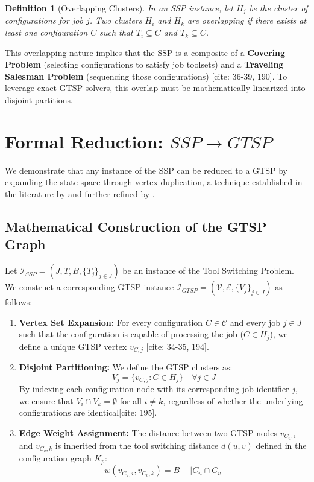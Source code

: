 \documentclass[12pt]{article}
\newtheorem{definition}{Definition}[section]
\begin{document}
\begin{definition}[Overlapping Clusters]
In an SSP instance, let $H_j$ be the cluster of configurations for job $j$. Two clusters $H_i$ and $H_k$ are overlapping if there exists at least one configuration $C$ such that $T_i \subseteq C$ and $T_k \subseteq C$. 
\end{definition}

This overlapping nature implies that the SSP is a composite of a \textbf{Covering Problem} (selecting configurations to satisfy job toolsets) and a \textbf{Traveling Salesman Problem} (sequencing those configurations) [cite: 36-39, 190]. To leverage exact GTSP solvers, this overlap must be mathematically linearized into disjoint partitions.

\section{Formal Reduction: $SSP \rightarrow GTSP$}

We demonstrate that any instance of the SSP can be reduced to a GTSP by expanding the state space through vertex duplication, a technique established in the literature by \textcite{Noon1993} and further refined by \textcite{Lien2015}.

\subsection{Mathematical Construction of the GTSP Graph}
Let $\mathcal{I}_{SSP} = (J, T, B, \{T_j\}_{j \in J})$ be an instance of the Tool Switching Problem. We construct a corresponding GTSP instance $\mathcal{I}_{GTSP} = (\mathcal{V}, \mathcal{E}, \{V_j\}_{j \in J})$ as follows:

\begin{enumerate}
    \item \textbf{Vertex Set Expansion:} For every configuration $C \in \mathcal{C}$ and every job $j \in J$ such that the configuration is capable of processing the job ($C \in H_j$), we define a unique GTSP vertex $v_{C,j}$ [cite: 34-35, 194].
    \item \textbf{Disjoint Partitioning:} We define the GTSP clusters as:
    \begin{equation}
        V_j = \{ v_{C,j} : C \in H_j \} \quad \forall j \in J
    \end{equation}
    By indexing each configuration node with its corresponding job identifier $j$, we ensure that $V_i \cap V_k = \emptyset$ for all $i \neq k$, regardless of whether the underlying configurations are identical[cite: 195].
    \item \textbf{Edge Weight Assignment:} The distance between two GTSP nodes $v_{C_u, i}$ and $v_{C_v, k}$ is inherited from the tool switching distance $d(u,v)$ defined in the configuration graph $K_p$:
    \begin{equation}
        w(v_{C_u, i}, v_{C_v, k}) = B - |C_u \cap C_v|
    \end{equation}
\end{enumerate}
\end{document}
